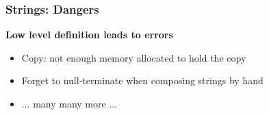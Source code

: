\begin{frame}
  \frametitle{Strings: Dangers}

  \textbf{Low level definition leads to errors}
  
  \begin{itemize}
  \item Copy: not enough memory allocated to hold the copy
  \item Forget to null-terminate when composing strings by hand
  \item ... many many more ...
  \end{itemize}
    
\end{frame}


